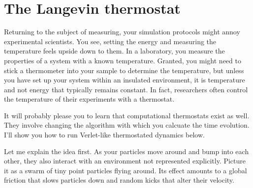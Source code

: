 \section{The Langevin thermostat}

Returning to the subject of measuring, your simulation protocols might annoy 
experimental scientists. You see, setting the energy and measuring the 
temperature feels upside down to them. In a laboratory, you measure the 
properties of a system with a known temperature. Granted, you might need to 
stick a thermometer into your sample to determine the temperature, but unless 
you have set up your system within an insulated environment, it is temperature 
and not energy that typically remains constant. In fact, researchers often 
control the temperature of their experiments with a thermostat.

It will probably please you to learn that computational thermostats exist as 
well. They involve changing the algorithm with which you calcuate the time 
evolution. I'll show you how to run Verlet-like thermostated dynamics below.

Let me explain the idea first. As your particles move around and bump into each 
other, they also interact with an environment not represented explicitly. 
Picture it as a swarm of tiny point particles flying around. Its effect amounts 
to a global friction that slows particles down and random kicks that alter their 
velocity.

